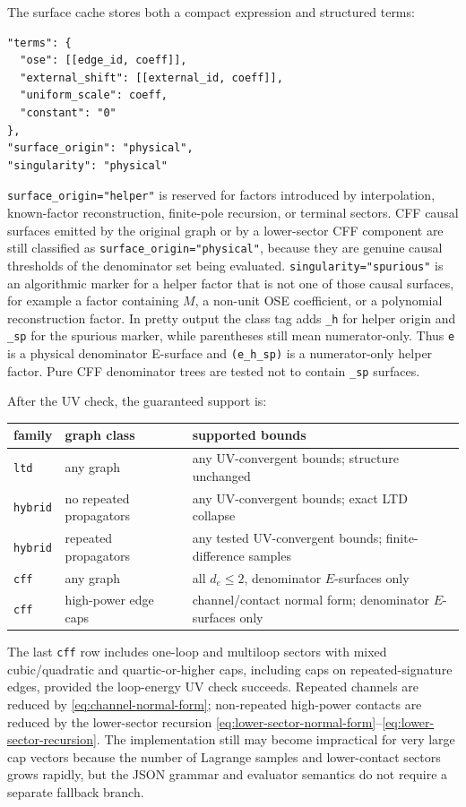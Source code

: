 \documentclass[11pt,a4paper]{report}
\begin{document}
The surface cache stores both a compact expression and structured terms:
\begin{lstlisting}
"terms": {
  "ose": [[edge_id, coeff]],
  "external_shift": [[external_id, coeff]],
  "uniform_scale": coeff,
  "constant": "0"
},
"surface_origin": "physical",
"singularity": "physical"
\end{lstlisting}
\texttt{surface\_origin="helper"} is reserved for factors introduced by
interpolation, known-factor reconstruction, finite-pole recursion, or terminal
sectors.  CFF causal surfaces emitted by the original graph or by a
lower-sector CFF component are still classified as
\texttt{surface\_origin="physical"}, because they are genuine causal thresholds
of the denominator set being evaluated.  \texttt{singularity="spurious"} is an
algorithmic marker for a helper factor that is not one of those causal
surfaces, for example a factor containing \(M\), a non-unit OSE coefficient, or
a polynomial reconstruction factor.  In pretty output the class tag adds
\texttt{\_h} for helper origin and \texttt{\_sp} for the spurious marker, while
parentheses still mean numerator-only.  Thus \texttt{e} is a physical
denominator E-surface and \texttt{(e\_h\_sp)} is a numerator-only helper factor.
Pure CFF denominator trees are tested not to contain \texttt{\_sp} surfaces.

After the UV check, the guaranteed support is:
\begin{center}
\begin{tabular}{lll}
\toprule
family & graph class & supported bounds \\
\midrule
\texttt{ltd} & any graph & any UV-convergent bounds; structure unchanged \\
\texttt{hybrid} & no repeated propagators & any UV-convergent bounds; exact LTD collapse \\
\texttt{hybrid} & repeated propagators & any tested UV-convergent bounds; finite-difference samples \\
\texttt{cff} & any graph & all \(d_e\le2\), denominator \(E\)-surfaces only \\
\texttt{cff} & high-power edge caps & channel/contact normal form; denominator \(E\)-surfaces only \\
\bottomrule
\end{tabular}
\end{center}

The last \texttt{cff} row includes one-loop and multiloop sectors with mixed
cubic/quadratic and quartic-or-higher caps, including caps on repeated-signature
edges, provided the loop-energy UV check succeeds.  Repeated channels are
reduced by \eqref{eq:channel-normal-form}; non-repeated high-power contacts are
reduced by the lower-sector recursion
\eqref{eq:lower-sector-normal-form}--\eqref{eq:lower-sector-recursion}.  The
implementation still may become impractical for very large cap vectors because
the number of Lagrange samples and lower-contact sectors grows rapidly, but the
JSON grammar and evaluator semantics do not require a separate fallback branch.
\end{document}
